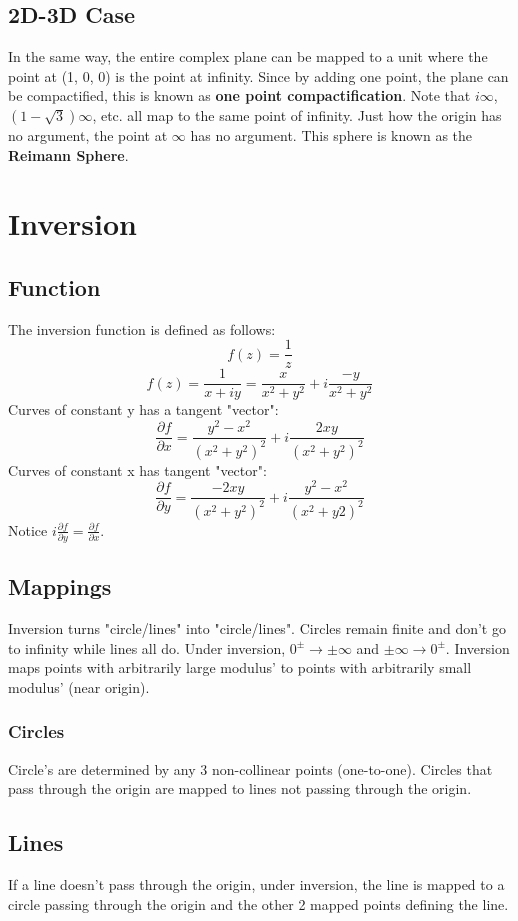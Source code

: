\documentclass[../main.tex]{subfiles}
\begin{document}
\subsection{2D-3D Case}
    In the same way, the entire complex plane can be mapped to a unit where the point at (1, 0, 0) is the point at infinity. Since by adding one point, the plane can be compactified, this is known as \textbf{one point compactification}.
    Note that $i\infty$, $(1-\sqrt{3})\infty$, etc. all map to the same point of infinity. Just how the origin has no argument, the point at $\infty$ has no argument. This sphere is known as the \textbf{Reimann Sphere}.

\section{Inversion}
\subsection{Function}
    The inversion function is defined as follows:
    $$f(z)=\frac{1}{z}$$
    $$f(z)=\frac{1}{x+iy}=\frac{x}{x^{2}+y^{2}}+i\frac{-y}{x^{2}+y^{2}}$$
    Curves of constant y has a tangent "vector":
    $$\frac{\partial f}{\partial x}=\frac{y^{2}-x^{2}}{(x^{2}+y^{2})^{2}}+i\frac{2xy}{(x^{2}+y^{2})^{2}}$$
    Curves of constant x has tangent "vector":
    $$\frac{\partial f}{\partial y}=\frac{-2xy}{(x^{2}+y^{2})^{2}}+i\frac{y^{2}-x^{2}}{(x^{2}+y{2})^{2}}$$
    Notice $i\frac{\partial f}{\partial y}=\frac{\partial f}{\partial x}$.

\subsection{Mappings}
    Inversion turns "circle/lines" into "circle/lines". Circles remain finite and don't go to infinity while lines all do. 
    Under inversion, $0^{\pm}\rightarrow\pm\infty$ and $\pm\infty\rightarrow0^{\pm}$. Inversion maps points with arbitrarily large modulus' to points with arbitrarily small modulus' (near origin).
    
    \subsubsection{Circles}
        Circle's are determined by any 3 non-collinear points (one-to-one). Circles that pass through the origin are mapped to lines not passing through the origin.

    \subsection{Lines}
        If a line doesn't pass through the origin, under inversion, the line is mapped to a circle passing through the origin and the other 2 mapped points defining the line.
\end{document}
